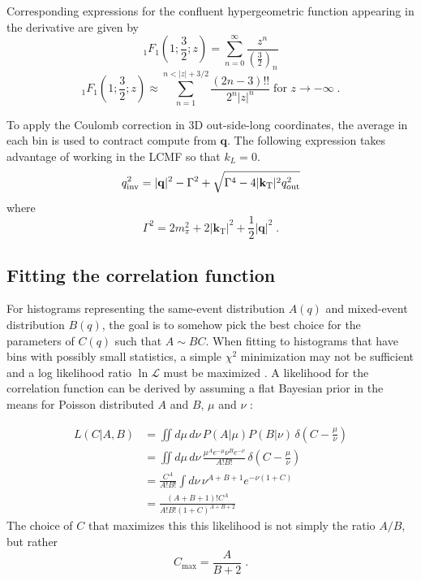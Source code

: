 Corresponding expressions for the confluent hypergeometric function appearing in the derivative are given by
\begin{equation}
 {}_1F_1 \left( 1;\frac{3}{2}; z \right) = \sum_{n=0}^{\infty} \frac{z^n}{\left(\frac{3}{2}\right)_n} 
\end{equation}
\begin{equation}
  {}_1F_1 \left( 1; \frac{3}{2}; z \right) \approx \sum_{n=1}^{n < |z| + 3/2} \frac{(2n-3)!!}{2^n |z|^n} \; \textrm{for } z \rightarrow -\infty\;.
\end{equation}

To apply the Coulomb correction in 3D out-side-long coordinates, the average \kt in each bin is used to contract compute \qinv from $\mathbf{q}$.
The following expression takes advantage of working in the \ac{LCMF} so that $k_L = 0$.
\begin{equation}
q_{\mathrm{inv}}^2 = |\mathbf{q}|^2 - \Gamma^2 + \sqrt{\Gamma^4 - 4 |\mathbf{k}_\mathrm{T}|^2 q_{\mathrm{out}}^2} \label{eq:q3_to_qinv}
\end{equation}
where
\begin{equation}
\Gamma^2 = 2 m_{\pi}^2 + 2 |\mathbf{k}_\mathrm{T}|^2 + \frac{1}{2}|\mathbf{q}|^2 \; .
\end{equation}



\subsection{Fitting the correlation function}

For histograms representing the same-event distribution $A(q)$ and mixed-event distribution $B(q)$, the goal is to somehow pick the best choice for the parameters of $C(q)$ such that $A \sim B C$.
When fitting to histograms that have bins with possibly small statistics, a simple $\chi^2$ minimization may not be sufficient and a log likelihood ratio $\ln\mathcal{L}$ must be maximized \cite{Baker:1983tu}.
A likelihood for the correlation function can be derived by assuming a flat Bayesian prior in the means for Poisson distributed $A$ and $B$, $\mu$ and $\nu$ \cite{Soltz:1994PhDT}:

\begin{equation}
  \begin{split}
    L(C|A,B) &= \iint d\mu \, d\nu \, P(A|\mu) P(B|\nu) \, \delta\left(C - \frac{\mu}{\nu} \right)\\
    &= \iint d\mu \, d\nu \, \frac{\mu^{A} e^{-\mu} \nu^{B} e^{-\nu}}{A! B!} \, \delta\left(C - \frac{\mu}{\nu} \right)\\
    &= \frac{C^A}{A! B!} \int d\nu \, \nu^{A+B+1} e^{-\nu (1+C)}\\
    &= \frac{(A+B+1)! C^A}{A! B! (1+C)^{A+B+2}}
  \end{split}
\end{equation}
The choice of $C$ that maximizes this this likelihood is not simply the ratio $A/B$, but rather
\begin{equation}
  C_{\textrm{max}} = \frac{A}{B+2} \; .
\end{equation}

